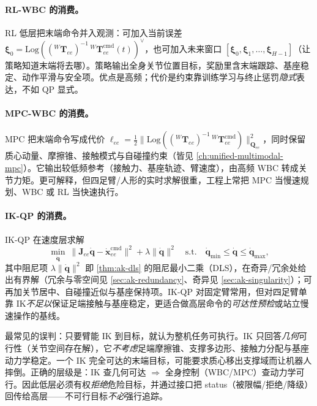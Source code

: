 \paragraph{RL-WBC 的消费。}
RL 低层把末端命令并入观测：可加入当前误差 $\boldsymbol\xi_0=\mathrm{Log}(({}^{W}\mathbf{T}_{ee})^{-1}\,{}^{W}\mathbf{T}_{ee}^{\mathrm{cmd}}(t))^\vee$，也可加入未来窗口 $[\boldsymbol\xi_0,\boldsymbol\xi_1,\dots,\boldsymbol\xi_{H-1}]$（让策略知道末端将去哪）。策略输出全身关节位置目标，奖励里含末端跟踪、基座稳定、动作平滑与安全项。优点是高频；代价是约束靠训练学习与终止惩罚\emph{隐式}表达，不如 QP 显式。

\paragraph{MPC-WBC 的消费。}
MPC 把末端命令写成代价 $\ell_{ee}=\tfrac12\|\mathrm{Log}(({}^{W}\mathbf{T}_{ee})^{-1}\,{}^{W}\mathbf{T}_{ee}^{\mathrm{cmd}})\|_{\mathbf Q_{ee}}^2$，同时保留质心动量、摩擦锥、接触模式与自碰撞约束（皆见 \cref{ch:unified-multimodal-mpc}）。它输出较低频参考（接触力、基座轨迹、臂速度），由高频 WBC 转成关节力矩。更可解释，但四足臂/人形的实时求解很重，工程上常把 MPC 当慢速规划、WBC 或 RL 当快速执行。

\paragraph{IK-QP 的消费。}
IK-QP 在速度层求解
\begin{equation}
  \min_{\dot{\mathbf q}}\ \big\|\mathbf J_{ee}\dot{\mathbf q}-\dot{\mathbf x}_{ee}^{\mathrm{cmd}}\big\|^2+\lambda\|\dot{\mathbf q}\|^2
  \quad\text{s.t.}\quad \dot{\mathbf q}_{\min}\le\dot{\mathbf q}\le\dot{\mathbf q}_{\max},
  \label{eq:si-ikqp}
\end{equation}
其中阻尼项 $\lambda\|\dot{\mathbf q}\|^2$ 即 \cref{thm:ak-dls} 的阻尼最小二乘（DLS），在奇异/冗余处给出有界解（冗余与零空间见 \cref{sec:ak-redundancy}、奇异见 \cref{sec:ak-singularity}）；可再加关节居中、自碰撞近似与基座保持项。IK-QP 对固定臂常用，但对四足臂单靠 IK\emph{不足以}保证足端接触与基座稳定，更适合做高层命令的\emph{可达性预检}或站立慢速操作的基线。

\begin{pitfall}
最常见的误判：只要臂能 IK 到目标，就认为整机任务可执行。IK 只回答\emph{几何}可行性（关节空间存在解），它\emph{不考虑}足端摩擦锥、支撑多边形、接触力分配与基座动力学稳定。一个 IK 完全可达的末端目标，可能要求质心移出支撑域而让机器人摔倒。正确的层级是：IK 查几何可达 $\Rightarrow$ 全身控制（WBC/MPC）查动力学可行。因此低层必须有权\emph{拒绝}危险目标，并通过接口把 status（被限幅/拒绝/降级）回传给高层——不可行目标\emph{不必}强行追踪。
\end{pitfall}

